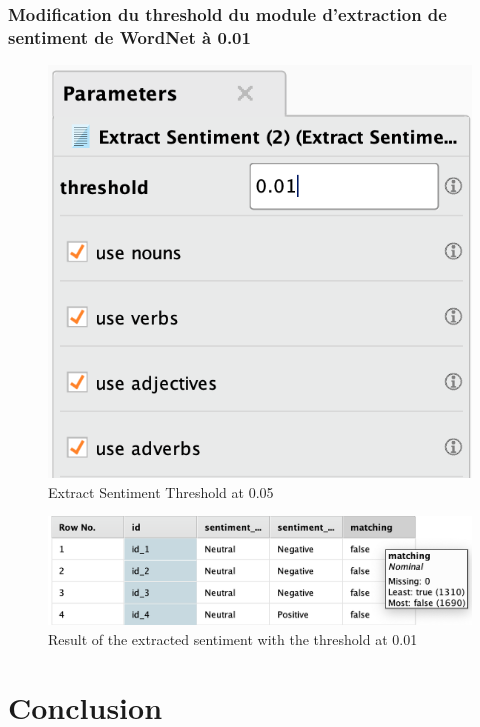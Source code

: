 \documentclass[a4paper]{article}
\begin{document}
\subsubsection{Modification du threshold du module d'extraction de sentiment de WordNet à 0.01}
\begin{figure}[H]
\begin{center}
	\includegraphics[width=\linewidth/3]{imgs/part_3/3_processing_documents_full_0_01}
	\caption{Extract Sentiment Threshold at 0.05}
	\label{fig:3_processing_documents_full_0_01}
\end{center}
\end{figure}
\begin{figure}[H]
	\includegraphics[width=\linewidth]{imgs/part_3/3_processing_documents_full_0_01_results}
	\caption{Result of the extracted sentiment with the threshold at 0.01}
	\label{fig:3_processing_documents_full_0_01_results}
\end{figure}


\section{Conclusion}
\end{document}
